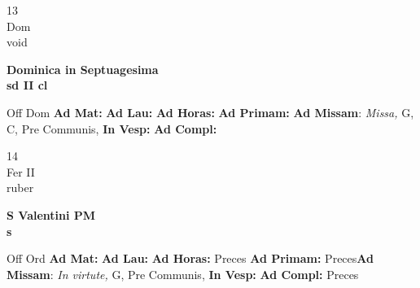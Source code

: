 \documentclass[10pt, openany]{book}
\begin{document}
    \begin{center}
        \begin{minipage}{3.5in}
            \vspace{2em}
            \begin{minipage}{0.5in}
                {\Huge 13} \\
                {\normalsize Dom} \\
                {\normalsize void}
            \end{minipage}
            \begin{minipage}{3.0in}
                \textbf{ \large Dominica in Septuagesima \\
                \textnormal{\normalsize sd II cl}} \\ 
            \end{minipage}
            \begin{justify}Off Dom
                \textbf{Ad Mat: }
                \textbf{Ad Lau: }
                \textbf{Ad Horas: }
                \textbf{Ad Primam: }\textbf{Ad Missam}: \textit{Missa,} G, C, Pre Communis,  
                \textbf{In Vesp: }
                \textbf{Ad Compl: }
            \end{justify}
        \end{minipage}
    \end{center}

    \begin{center}
        \begin{minipage}{3.5in}
            \vspace{2em}
            \begin{minipage}{0.5in}
                {\Huge 14} \\
                {\normalsize Fer II} \\
                {\normalsize ruber}
            \end{minipage}
            \begin{minipage}{3.0in}
                \textbf{ \large S Valentini PM \\
                \textnormal{\normalsize s}} \\ 
            \end{minipage}
            \begin{justify}Off Ord
                \textbf{Ad Mat: }
                \textbf{Ad Lau: }
                \textbf{Ad Horas: }Preces
                \textbf{Ad Primam: }Preces\textbf{Ad Missam}: \textit{In virtute,} G, Pre Communis,  
                \textbf{In Vesp: }
                \textbf{Ad Compl: }Preces
            \end{justify}
        \end{minipage}
    \end{center}
\end{document}

